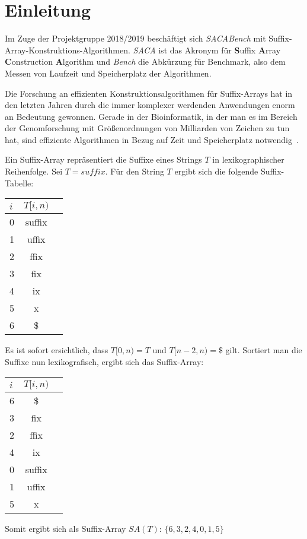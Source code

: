 \chapter{Einleitung}

Im  Zuge der Projektgruppe 2018/2019 beschäftigt sich
\emph{SACABench} mit Suffix-Array-Konstruktions-Algorithmen. \emph{SACA} ist das Akronym für
\textbf{S}uffix \textbf{A}rray \textbf{C}onstruction \textbf{A}lgorithm und \emph{Bench} die Abkürzung für Benchmark,
also dem Messen von Laufzeit und Speicherplatz der Algorithmen.

Die Forschung an effizienten Konstruktionsalgorithmen für Suffix-Arrays hat in den letzten Jahren durch die
immer komplexer werdenden Anwendungen enorm an Bedeutung gewonnen. Gerade in der Bioinformatik,
in der man es im Bereich der Genomforschung mit Größenordnungen von Milliarden von Zeichen zu tun hat,
sind effiziente Algorithmen in Bezug auf Zeit und Speicherplatz notwendig~\cite[ch.~1]{saca:6}.

Ein Suffix-Array repräsentiert die Suffixe eines Strings $T$ in lexikographischer Reihenfolge.
Sei $T=suffix$. Für den String $T$ ergibt sich die folgende Suffix-Tabelle:
%
\begin{center}
  \begin{tabular}{ | l | c | r }
    \hline
        $i$ & $T[i, n)$ \\ \hline
        0 & suffix \\ \hline
        1 & uffix \\ \hline
        2 & ffix \\ \hline
        3 & fix \\ \hline
        4 & ix \\ \hline
        5 & x \\ \hline
        6 & \$ \\
    \hline
  \end{tabular}
\end{center}
%
Es ist sofort ersichtlich, dass $T[0, n) = T$ und $T[n-2, n)=\$$ gilt.
Sortiert man die Suffixe nun lexikografisch, ergibt sich das Suffix-Array:
%
\begin{center}
  \begin{tabular}{ | l | c | r }
    \hline
        $i$ & $T[i, n)$ \\ \hline
        6 & \$ \\ \hline
        3 & fix \\ \hline
        2 & ffix \\ \hline
        4 & ix \\ \hline
        0 & suffix \\ \hline
        1 & uffix \\ \hline
        5 & x \\
    \hline
  \end{tabular}
\end{center}
%
Somit ergibt sich als Suffix-Array $SA(T)$: $\{6,3,2,4,0,1,5\}$

